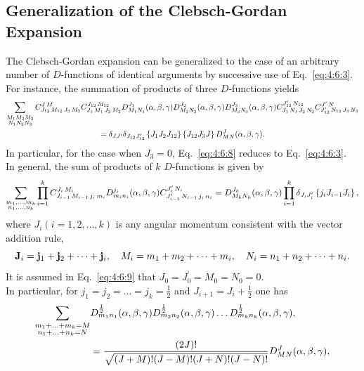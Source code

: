 \subsection{Generalization of the Clebsch-Gordan Expansion}\label{sec:4.6.3}
The Clebsch-Gordan expansion can be generalized to the case of an arbitrary number of $D$-functions of identical arguments by successive use of Eq.~\eqref{eq:4:6:3}. For instance, the summation of products of three $D$-functions yields
\begin{multline}
\sum_{\substack{M_{1} M_{2} M_{3} \\
N_{1} N_{2} N_{3}}} C_{J_{12}\,M_{12}\,J_{3}\,M_{3}}^{J\,M} C_{J_{1}\,M_{1}\,J_{2}\,M_{2}}^{J_{12}\,M_{12}} D_{M_{1} N_{1}}^{J_{1}}(\alpha, \beta, \gamma) D_{M_{2} N_{2}}^{J_{2}}(\alpha, \beta, \gamma) D_{M_{3} N_{3}}^{J_{3}}(\alpha, \beta, \gamma) C_{J_{1}\,N_{1}\,J_{2}\,N_{2}}^{J_{12}^{\prime}\,N_{12}} C_{J_{12}^{\prime}\,N_{12}\,J_{3}\,N_{3}}^{J^{\prime}\,N}  \\
=\delta_{J J^{\prime}} \delta_{J_{12} J_{12}^{\prime}}\left\{J_{1} J_{2} J_{12}\right\}\left\{J_{12} J_{3} J\right\} D_{M N}^{J}(\alpha, \beta, \gamma) . \label{eq:4:6:8}
\end{multline}
In particular, for the case when $J_{3}=0$, Eq.~\eqref{eq:4:6:8} reduces to Eq.~\eqref{eq:4:6:3}.\\
In general, the sum of products of $k$ $D$-functions is given by
\begin{equation}
\sum_{\substack{m_{1}, \ldots, m_{k} \\ n_{1}, \ldots, n_{k}}} \prod_{i=1}^{k} C_{J_{i-1}\,M_{i-1}\,j_{i}\,m_{i}}^{J_{i}\,M_{i}} D_{m_{i} n_{i}}^{j_{i}}(\alpha, \beta, \gamma) C_{J_{i-1}^{\prime}\,N_{i-1}\,j_{i}\,n_{i}}^{J_{i}^{\prime}\,N_{i}}=D_{M_{k} N_{k}}^{J_{k}}(\alpha, \beta, \gamma) \prod_{i=1}^{k} \delta_{J_{i} J_{i}^{\prime}}\left\{j_{i} J_{i-1} J_{i}\right\} ,\label{eq:4:6:9}
\end{equation}
where $J_{i}(i=1,2, \ldots, k)$ is any angular momentum consistent with the vector addition rule,
\[
\mathbf{J}_{i}=\mathbf{j}_{1}+\mathbf{j}_{2}+\cdots+\mathbf{j}_{i}, \quad M_{i}=m_{1}+m_{2}+\cdots+m_{i}, \quad N_{i}=n_{1}+n_{2}+\cdots+n_{i}.
\]
It is assumed in Eq.~\eqref{eq:4:6:9} that $J_{0}=J_{0}^{\prime}=M_{0}=N_{0}=0$.\\
In particular, for $j_{1}=j_{2}=\ldots=j_{k}=\frac{1}{2}$ and $J_{i+1}=J_{i}+\frac{1}{2}$ one has
\begin{align}
\sum_{\substack{m_{1}+\ldots+m_{k}=M \\
n_{1}+\ldots+n_{k}=N}} & D_{m_{1} n_{1}}^{\frac{1}{2}}(\alpha, \beta, \gamma) D_{m_{2} n_{2}}^{\frac{1}{2}}(\alpha, \beta, \gamma) \ldots D_{m_{k} n_{k}}^{\frac{1}{2}}(\alpha, \beta, \gamma)  ,\notag\\
& =\frac{(2 J)!}{\sqrt{(J+M)!(J-M)!(J+N)!(J-N)!}} D_{M N}^{J}(\alpha, \beta, \gamma) ,\label{eq:4:6:10}
\end{align}
